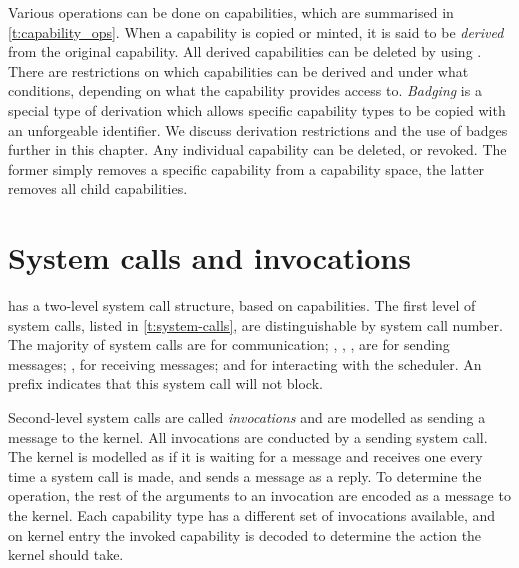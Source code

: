 Various operations can be done on capabilities, which are summarised in \cref{t:capability_ops}.
When a capability is copied or minted, it is said to be \emph{derived} from the original capability.
All derived capabilities can be deleted by using \cnoderevoke.
There are restrictions on which capabilities can be derived and under what conditions, depending on
what the capability provides access to. 
\emph{Badging} is a special type of derivation which allows specific capability types to be copied
with an unforgeable identifier. We discuss derivation restrictions and the use of badges further
in this chapter.
Any individual capability can be deleted, or revoked. The former simply removes a specific
capability from a capability space, the latter removes all child capabilities.

\section{System calls and invocations}
\label{sec:sel4-system-call-and-invocations}

\selfour has a two-level system call structure, based on capabilities. The first level of system
calls, listed in \cref{t:system-calls}, are distinguishable by system call number.  The majority of
system calls are for communication; \send, \nbsend, \call, \reply are for
sending messages; \recv, \nbrecv for receiving messages; and \yield for
interacting with the scheduler. An  prefix indicates that this system call will not block.

Second-level system calls are called \emph{invocations} and are modelled as sending a message
to the kernel. All invocations are conducted by a sending system call. The kernel is modelled as if
it is waiting for a message and receives one every time a system call is made, and sends a message
as a reply. 
To determine the operation, the rest of the arguments to an invocation are encoded as a message to
the kernel. Each capability type has a different set of invocations available, and on kernel entry 
 the invoked capability is decoded to determine the action the kernel should take. 

